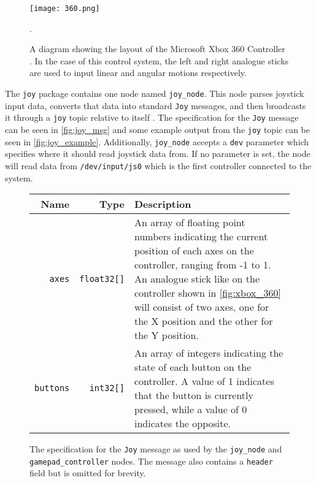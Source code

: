 \begin{figure}[!h]
	\centering
	\texttt{[image: 360.png]}
	\caption{A diagram showing the layout of the Microsoft Xbox 360 Controller \cite{360_controller}. In the case of this control system, the left and right analogue sticks are used to input linear and angular motions respectively.}.
	\label{fig:xbox_360}
\end{figure}

The \texttt{joy} package contains one node named \texttt{joy\_node}. This node parses joystick input data, converts that data into standard \texttt{Joy} messages, and then broadcasts it through a \texttt{joy} topic relative to itself \cite{ros_wiki_joy}. The specification for the \texttt{Joy} message can be seen in \autoref{fig:joy_msg} and some example output from the \texttt{joy} topic can be seen in \autoref{fig:joy_example}. Additionally, \texttt{joy\_node} accepts a \texttt{dev} parameter which specifies where it should read joystick data from. If no parameter is set, the node will read data from \texttt{/dev/input/js0} which is the first controller connected to the system. 

\begin{figure}[!h]
	\centering
	\begin{tabular}{ r r p{10cm} }
		\toprule
		\textbf{Name} & \textbf{Type} & \textbf{Description} \\
		\midrule

		\texttt{axes} & 
		\texttt{float32[]} &
		An array of floating point numbers indicating the current position of each axes on the controller, ranging from -1 to 1. An analogue stick like on the controller shown in \autoref{fig:xbox_360} will consist of two axes, one for the X position and the other for the Y position. \\
		\hline
		\texttt{buttons} & 
		\texttt{int32[]} & 
		An array of integers indicating the state of each button on the controller. A value of 1 indicates that the button is currently pressed, while a value of 0 indicates the opposite. \\
		\bottomrule
	\end{tabular}
	\caption{The specification for the \texttt{Joy} message as used by the \texttt{joy\_node} and \texttt{gamepad\_controller} nodes. The message also contains a \texttt{header} field but is omitted for brevity.}
	\label{fig:joy_msg}
\end{figure}

